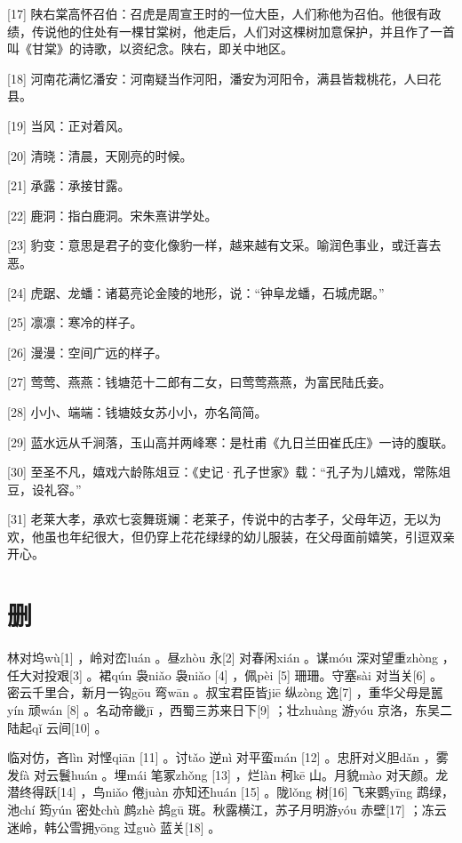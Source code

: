 \documentclass[12pt,UTF8]{ctexbook}
\begin{document}
[17] 陕右棠高怀召伯：召虎是周宣王时的一位大臣，人们称他为召伯。他很有政绩，传说他的住处有一棵甘棠树，他走后，人们对这棵树加意保护，并且作了一首叫《甘棠》的诗歌，以资纪念。陕右，即关中地区。

[18] 河南花满忆潘安：河南疑当作河阳，潘安为河阳令，满县皆栽桃花，人曰花县。

[19] 当风：正对着风。

[20] 清晓：清晨，天刚亮的时候。

[21] 承露：承接甘露。

[22] 鹿洞：指白鹿洞。宋朱熹讲学处。

[23] 豹变：意思是君子的变化像豹一样，越来越有文采。喻润色事业，或迁喜去恶。

[24] 虎踞、龙蟠：诸葛亮论金陵的地形，说：“钟阜龙蟠，石城虎踞。”

[25] 凛凛：寒冷的样子。

[26] 漫漫：空间广远的样子。

[27] 莺莺、燕燕：钱塘范十二郎有二女，曰莺莺燕燕，为富民陆氏妾。

[28] 小小、端端：钱塘妓女苏小小，亦名简简。

[29] 蓝水远从千涧落，玉山高并两峰寒：是杜甫《九日兰田崔氏庄》一诗的腹联。

[30] 至圣不凡，嬉戏六龄陈俎豆：《史记·孔子世家》载：“孔子为儿嬉戏，常陈俎豆，设礼容。”

[31] 老莱大孝，承欢七衮舞斑斓：老莱子，传说中的古孝子，父母年迈，无以为欢，他虽也年纪很大，但仍穿上花花绿绿的幼儿服装，在父母面前嬉笑，引逗双亲开心。





\chapter{删}


林对坞wù[1] ，岭对峦luán 。昼zhòu 永[2] 对春闲xián 。谋móu 深对望重zhòng ，任大对投艰[3] 。裙qún 袅niǎo 袅niǎo [4] ，佩pèi [5] 珊珊。守塞sài 对当关[6] 。密云千里合，新月一钩gōu 弯wān 。叔宝君臣皆jiē 纵zòng 逸[7] ，重华父母是嚚yín 顽wán [8] 。名动帝畿jī ，西蜀三苏来日下[9] ；壮zhuàng 游yóu 京洛，东吴二陆起qǐ 云间[10] 。

临对仿，吝lìn 对悭qiān [11] 。讨tǎo 逆nì 对平蛮mán [12] 。忠肝对义胆dǎn ，雾发fà 对云鬟huán 。埋mái 笔冢zhǒng [13] ，烂làn 柯kē 山。月貌mào 对天颜。龙潜终得跃[14] ，鸟niǎo 倦juàn 亦知还huán [15] 。陇lǒng 树[16] 飞来鹦yīng 鹉绿，池chí 筠yún 密处chù 鹧zhè 鸪gū 斑。秋露横江，苏子月明游yóu 赤壁[17] ；冻云迷岭，韩公雪拥yōng 过guò 蓝关[18] 。
\end{document}
